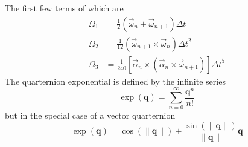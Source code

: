 The first few terms of which are
\begin{align}
    \Omega_{1} & = \frac{1}{2}\left(\vec{\omega}_{n} + \vec{\omega}_{n+1}\right)\Delta t                                                   \\
    \Omega_{2} & = \frac{1}{12}\left(\vec{\omega}_{n+1} \times \vec{\omega}_{n}\right){\Delta t}^{2}                                       \\
    \Omega_{3} & = \frac{1}{240}\left[\vec{\alpha}_{n} \times \left(\vec{\alpha}_{n} \times \vec{\omega}_{n+1}\right)\right]{\Delta t}^{5}
\end{align}
The quarternion exponential is defined by the infinite series
\begin{equation}
    \exp\left(\mathbf{q}\right) = \sum_{n=0}^{\infty} \frac{\mathbf{q}^{n}}{n!}
\end{equation}
but in the special case of a vector quarternion
\begin{equation*}
    \exp\left(\mathbf{q}\right) = \cos\left(\lVert\mathbf{q}\rVert\right) + \frac{\sin\left(\lVert\mathbf{q}\rVert\right)}{\lVert\mathbf{q}\rVert}\mathbf{q}
\end{equation*}

